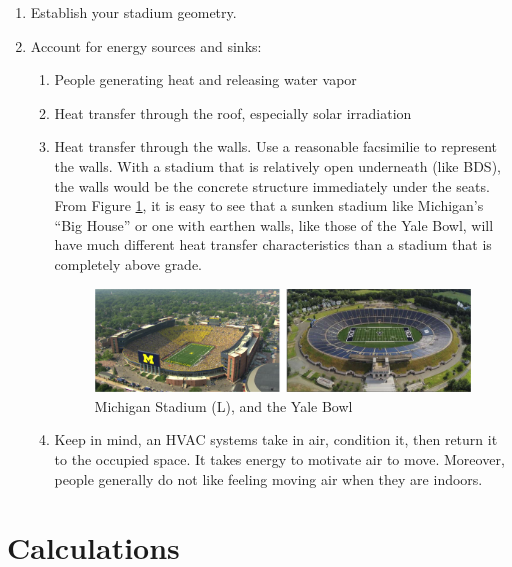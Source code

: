 \documentclass[
]{book}
\providecommand{\tightlist}{%
  \setlength{\itemsep}{0pt}\setlength{\parskip}{0pt}}
\begin{document}
\begin{enumerate}
\def\labelenumi{\arabic{enumi}.}
\tightlist
\item
  Establish your stadium geometry.
\item
  Account for energy sources and sinks:

  \begin{enumerate}
  \def\labelenumii{\alph{enumii}.}
  \item
    People generating heat and releasing water vapor
  \item
    Heat transfer through the roof, especially solar irradiation
  \item
    Heat transfer through the walls. Use a reasonable facsimilie to represent the walls. With a stadium that is relatively open underneath (like BDS), the walls would be the concrete structure immediately under the seats. From Figure \ref{fig:bighousebowl}, it is easy to see that a sunken stadium like Michigan's ``Big House'' or one with earthen walls, like those of the Yale Bowl, will have much different heat transfer characteristics than a stadium that is completely above grade.

    \begin{figure}
     \includegraphics[width=23.94in]{figures/bighousebowl} \caption{Michigan Stadium (L), and the Yale Bowl}\label{fig:bighousebowl}
     \end{figure}
  \item
    Keep in mind, an HVAC systems take in air, condition it, then return it to the occupied space. It takes energy to motivate air to move. Moreover, people generally do not like feeling moving air when they are indoors.
  \end{enumerate}
\end{enumerate}

\hypertarget{calculations}{%
\section{Calculations}\label{calculations}}
\end{document}
